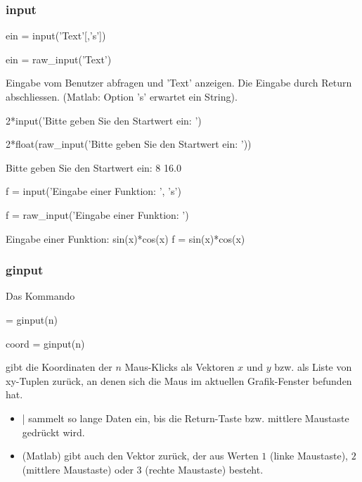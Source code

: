 \documentclass[hyperref={xetex}]{beamer}
\begin{document}
%
%
\begin{frame}[fragile]\frametitle{input}
\begin{matlabin}
ein = input('Text'[,'s'])
\end{matlabin}
\begin{pyin}
ein = raw_input('Text')  
\end{pyin}
Eingabe vom Benutzer abfragen und 'Text' anzeigen. Die Eingabe durch Return abschliessen. (Matlab: Option 's' erwartet ein String).

\begin{matlabin}
2*input('Bitte geben Sie den Startwert ein: ')
\end{matlabin}
\begin{pyin}
2*float(raw_input('Bitte geben Sie den Startwert ein: '))
\end{pyin}
\begin{matlab}
Bitte geben Sie den Startwert ein: 8
16.0
\end{matlab}
\begin{matlabin}
f = input('Eingabe einer Funktion: ', 's')
\end{matlabin}
\begin{pyin}
f = raw_input('Eingabe einer Funktion: ')
\end{pyin}
\begin{matlab}
Eingabe einer Funktion: sin(x)*cos(x)
f = sin(x)*cos(x)
\end{matlab}
\end{frame}
%
%
\begin{frame}[fragile]\frametitle{ginput}
Das Kommando 
\begin{matlabin}
[x,y] = ginput(n)
\end{matlabin}
\begin{pyin}
coord = ginput(n)  
\end{pyin}
gibt die Koordinaten der $n$ Maus-Klicks als Vektoren $x$ und $y$ bzw. als Liste von xy-Tuplen zurück, 
an denen sich die Maus im aktuellen Grafik-Fenster befunden hat.  
\begin{itemize}
  \item {}|  sammelt so lange Daten ein, bis die
  Return-Taste bzw. mittlere Maustaste gedrückt wird.
\item {}(Matlab) gibt auch den Vektor 
  zurück, der aus Werten $1$ (linke Maustaste), $2$ (mittlere
  Maustaste) oder $3$ (rechte Maustaste) besteht. 
\end{itemize} 
\end{frame}
\end{document}
